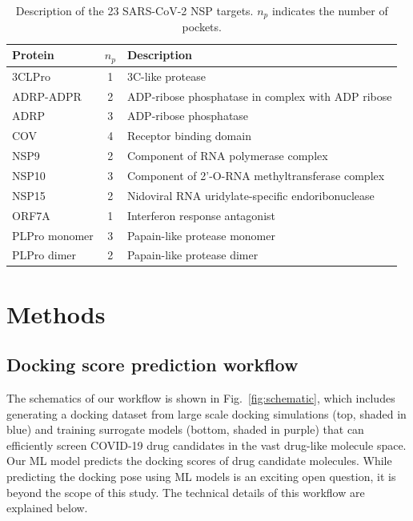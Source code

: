 \documentclass[conference]{IEEEtran}
\begin{document}
\begin{table}[thb]
\centering
\caption{\label{tab:table-targets} Description of the 23 SARS-CoV-2 NSP targets. $n_p$ indicates the number of pockets.}
\begin{tabularx}{\columnwidth}{l|c|X}
\toprule
Protein      & $n_p$  & Description \\
\midrule
\hline
3CLPro      & 1  &  3C-like protease\cite{roe2021mpro} \\
ADRP-ADPR   & 2  &  ADP-ribose phosphatase  in complex with ADP ribose\cite{michalska2020adrp}          \\
ADRP        & 3  &  ADP-ribose phosphatase\cite{michalska2020adrp} \\
COV         & 4  &  Receptor binding domain           \\
NSP9        & 2  &  Component of RNA polymerase complex\cite{Kahn2021}   \\
NSP10       & 3  &  Component of 2'-O-RNA methyltransferase complex\cite{Krafcikova2020}  \\
NSP15       & 2  &  Nidoviral RNA uridylate-specific endoribonuclease\cite{Kim2020}           \\
ORF7A       & 1  &   Interferon response antagonist\cite{Cao2021}          \\
PLPro monomer & 3 &  Papain-like protease monomer\cite{rut2020plpro} \\
PLPro dimer      & 2  &  Papain-like protease dimer  \\
\bottomrule
\end{tabularx}
\end{table}

\section{Methods}
\subsection{Docking score prediction workflow}
The schematics of our workflow is shown in Fig.~\ref{fig:schematic}, which includes generating a docking dataset from large scale docking simulations (top, shaded in blue) and training surrogate models (bottom, shaded in purple) that can efficiently screen COVID-19 drug candidates in the vast drug-like molecule space. Our ML model predicts the docking scores of drug candidate molecules. While predicting the docking pose using ML models is an exciting open question, it is beyond the scope of this study. The technical details of this workflow are explained below. 
\end{document}
